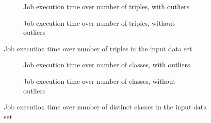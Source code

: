 \begin{figure}[ht]
  \begin{subfigure}{\textwidth}
    \centering
    
    \caption{Job execution time over number of  \glspl{triple}, with outliers}
    \label{fig:jobs-over-P31s-with-outliers}
  \end{subfigure}
  \begin{subfigure}{\textwidth}
    \centering
    
    \caption{Job execution time over number of  \glspl{triple}, without outliers}
    \label{fig:jobs-over-P31s-without-outliers}
  \end{subfigure}
  \caption{Job execution time over number of  \glspl{triple} in the input data set}
  \label{fig:jobs-over-P31s}
\end{figure}

\begin{figure}[ht]
  \begin{subfigure}{\textwidth}
    \centering
    
    \caption{Job execution time over number of classes, with outliers}
    \label{fig:jobs-over-classes-with-outliers}
  \end{subfigure}
  \begin{subfigure}{\textwidth}
    \centering
    
    \caption{Job execution time over number of classes, without outliers}
    \label{fig:jobs-over-classes-without-outliers}
  \end{subfigure}
  \caption{Job execution time over number of distinct classes in the input data set}
  \label{fig:jobs-over-classes}
\end{figure}
